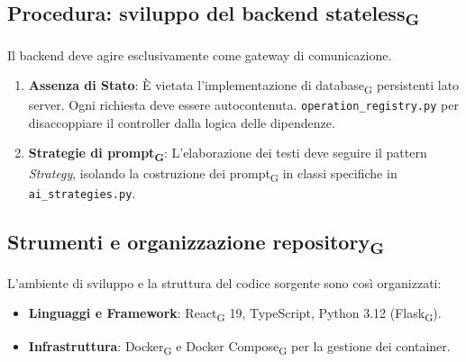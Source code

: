 \documentclass[11pt,a4paper]{article}
\newcommand{\gls}[1]{#1\textsubscript{G}}
\begin{document}
\subsection{Procedura: sviluppo del backend \gls{stateless}}
Il backend deve agire esclusivamente come gateway di comunicazione.
\begin{enumerate}
    \item \textbf{Assenza di Stato}: È vietata l'implementazione di \gls{database} persistenti lato server. Ogni richiesta deve essere autocontenuta.
    \texttt{operation\_registry.py} per disaccoppiare il controller dalla logica delle dipendenze.
    \item \textbf{Strategie di \gls{prompt}}: L'elaborazione dei testi deve seguire il pattern \textit{Strategy}, isolando la costruzione dei \gls{prompt} in classi specifiche in \texttt{ai\_strategies.py}.
\end{enumerate}

\subsection{Strumenti e organizzazione \gls{repository}}
L'ambiente di sviluppo e la struttura del codice sorgente sono così organizzati:
\begin{itemize}
    \item \textbf{Linguaggi e Framework}: \gls{React} 19, TypeScript, Python 3.12 (\gls{Flask}).
    \item \textbf{Infrastruttura}: \gls{Docker} e \gls{Docker Compose} per la gestione dei container.
\end{itemize}
\end{document}
